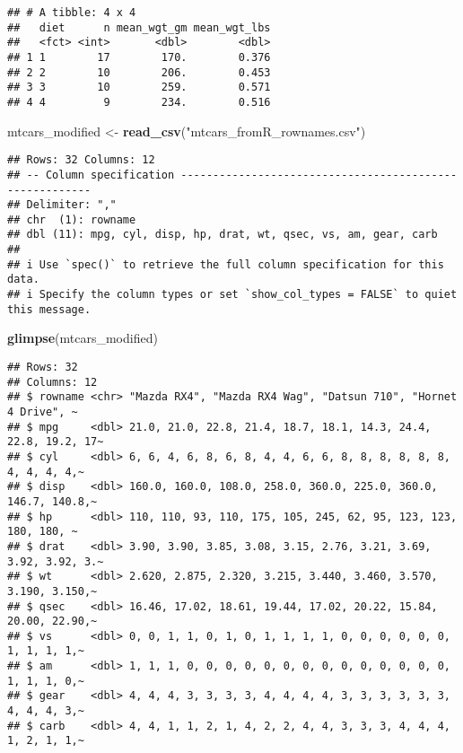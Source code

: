 \documentclass[
]{article}
\newenvironment{Shaded}{\begin{snugshade}}{\end{snugshade}}
\newcommand{\FunctionTok}[1]{\textcolor[rgb]{0.13,0.29,0.53}{\textbf{#1}}}
\newcommand{\NormalTok}[1]{#1}
\newcommand{\OtherTok}[1]{\textcolor[rgb]{0.56,0.35,0.01}{#1}}
\newcommand{\StringTok}[1]{\textcolor[rgb]{0.31,0.60,0.02}{#1}}
\begin{document}
\begin{verbatim}
## # A tibble: 4 x 4
##   diet      n mean_wgt_gm mean_wgt_lbs
##   <fct> <int>       <dbl>        <dbl>
## 1 1        17        170.        0.376
## 2 2        10        206.        0.453
## 3 3        10        259.        0.571
## 4 4         9        234.        0.516
\end{verbatim}

\begin{Shaded}
\begin{Highlighting}[]
\NormalTok{mtcars\_modified }\OtherTok{\textless{}{-}} \FunctionTok{read\_csv}\NormalTok{(}\StringTok{"mtcars\_fromR\_rownames.csv"}\NormalTok{)}
\end{Highlighting}
\end{Shaded}

\begin{verbatim}
## Rows: 32 Columns: 12
## -- Column specification --------------------------------------------------------
## Delimiter: ","
## chr  (1): rowname
## dbl (11): mpg, cyl, disp, hp, drat, wt, qsec, vs, am, gear, carb
## 
## i Use `spec()` to retrieve the full column specification for this data.
## i Specify the column types or set `show_col_types = FALSE` to quiet this message.
\end{verbatim}

\begin{Shaded}
\begin{Highlighting}[]
\FunctionTok{glimpse}\NormalTok{(mtcars\_modified)}
\end{Highlighting}
\end{Shaded}

\begin{verbatim}
## Rows: 32
## Columns: 12
## $ rowname <chr> "Mazda RX4", "Mazda RX4 Wag", "Datsun 710", "Hornet 4 Drive", ~
## $ mpg     <dbl> 21.0, 21.0, 22.8, 21.4, 18.7, 18.1, 14.3, 24.4, 22.8, 19.2, 17~
## $ cyl     <dbl> 6, 6, 4, 6, 8, 6, 8, 4, 4, 6, 6, 8, 8, 8, 8, 8, 8, 4, 4, 4, 4,~
## $ disp    <dbl> 160.0, 160.0, 108.0, 258.0, 360.0, 225.0, 360.0, 146.7, 140.8,~
## $ hp      <dbl> 110, 110, 93, 110, 175, 105, 245, 62, 95, 123, 123, 180, 180, ~
## $ drat    <dbl> 3.90, 3.90, 3.85, 3.08, 3.15, 2.76, 3.21, 3.69, 3.92, 3.92, 3.~
## $ wt      <dbl> 2.620, 2.875, 2.320, 3.215, 3.440, 3.460, 3.570, 3.190, 3.150,~
## $ qsec    <dbl> 16.46, 17.02, 18.61, 19.44, 17.02, 20.22, 15.84, 20.00, 22.90,~
## $ vs      <dbl> 0, 0, 1, 1, 0, 1, 0, 1, 1, 1, 1, 0, 0, 0, 0, 0, 0, 1, 1, 1, 1,~
## $ am      <dbl> 1, 1, 1, 0, 0, 0, 0, 0, 0, 0, 0, 0, 0, 0, 0, 0, 0, 1, 1, 1, 0,~
## $ gear    <dbl> 4, 4, 4, 3, 3, 3, 3, 4, 4, 4, 4, 3, 3, 3, 3, 3, 3, 4, 4, 4, 3,~
## $ carb    <dbl> 4, 4, 1, 1, 2, 1, 4, 2, 2, 4, 4, 3, 3, 3, 4, 4, 4, 1, 2, 1, 1,~
\end{verbatim}
\end{document}
